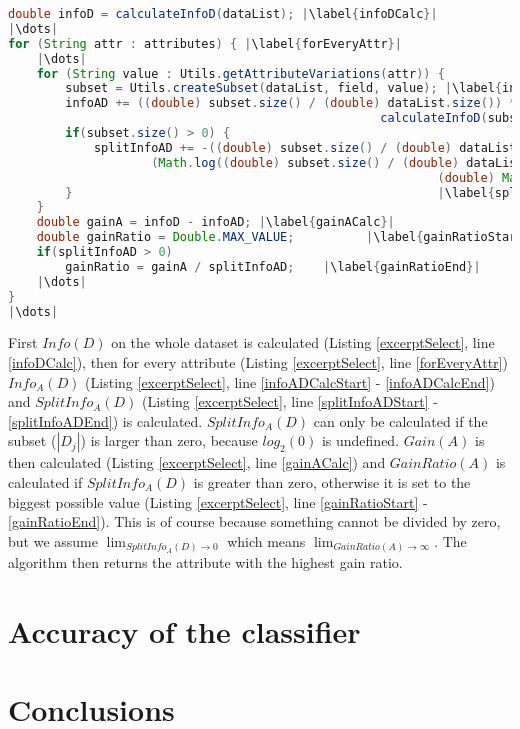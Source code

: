 \documentclass{article}
\begin{document}
    \begin{lstlisting}[language=Java, caption=Excerpt from \protect\UseVerb{term}, label={excerptSelect}, escapechar=|]
double infoD = calculateInfoD(dataList); |\label{infoDCalc}|
|\dots|
for (String attr : attributes) { |\label{forEveryAttr}|
    |\dots|
    for (String value : Utils.getAttributeVariations(attr)) {
        subset = Utils.createSubset(dataList, field, value); |\label{infoADCalcStart}|
        infoAD += ((double) subset.size() / (double) dataList.size()) *
                                                    calculateInfoD(subset); |\label{infoADCalcEnd}|
        if(subset.size() > 0) {                                             |\label{splitInfoADStart}|
            splitInfoAD += -((double) subset.size() / (double) dataList.size()) *
                    (Math.log((double) subset.size() / (double) dataList.size()) /
                                                            (double) Math.log(2));
        }                                                   |\label{splitInfoADEnd}|
    }
    double gainA = infoD - infoAD; |\label{gainACalc}|
    double gainRatio = Double.MAX_VALUE;          |\label{gainRatioStart}|
    if(splitInfoAD > 0)
        gainRatio = gainA / splitInfoAD;    |\label{gainRatioEnd}|
    |\dots|
}
|\dots|\end{lstlisting}
    First $Info(D)$ on the whole dataset is calculated (Listing \ref{excerptSelect}, line \ref{infoDCalc}), then for every attribute (Listing \ref{excerptSelect}, line \ref{forEveryAttr}) $Info_A (D)$ (Listing \ref{excerptSelect}, line \ref{infoADCalcStart} - \ref{infoADCalcEnd}) and $SplitInfo_A (D)$ (Listing \ref{excerptSelect}, line \ref{splitInfoADStart} - \ref{splitInfoADEnd}) is calculated. $SplitInfo_A (D)$ can only be calculated if the subset ($|D_j|$) is larger than zero, because $log_2 (0)$ is undefined.
    $Gain(A)$ is then calculated (Listing \ref{excerptSelect}, line \ref{gainACalc}) and $GainRatio(A)$ is calculated if $SplitInfo_A (D)$ is greater than zero, otherwise it is set to the biggest possible value  (Listing \ref{excerptSelect}, line \ref{gainRatioStart} - \ref{gainRatioEnd}). This is of course because something cannot be divided by zero, but we assume \(\lim_{SplitInfo_A (D) \to 0}\) which means  \(\lim_{GainRatio(A) \to \infty}\).
    The algorithm then returns the attribute with the highest gain ratio.
\section{Accuracy of the classifier}

\section{Conclusions}



\end{document}
